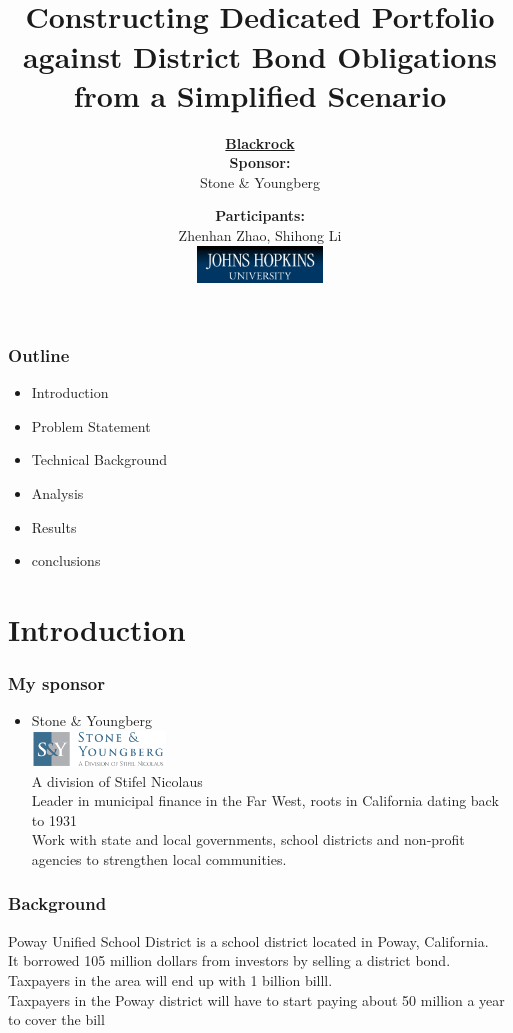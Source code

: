 \documentclass[compress,handout,10pt]{beamer}
\title{\\
{\color{black} \bf {\Large Constructing Dedicated Portfolio \\against District Bond Obligations \\from a Simplified Scenario}\newline \\
 } }
\subtitle{{\color{black} \bf{\underline{Blackrock} }\\ \vspace{2mm}\small \bf{Sponsor:}} \\\vspace{2mm}  \color{black} Stone \& Youngberg }
\author{  {\bf{Participants:}} \\ \vspace{2mm}
Zhenhan Zhao, Shihong Li\\
\vspace{2mm} 
\includegraphics[width=0.25\textwidth]{jhu.png} 
}
\institute{JHU AMS 2012 FALL}
\let\olditem\item
\renewcommand{\item}{\setlength{\itemsep}{0.5\baselineskip}\olditem}
\begin{document}
\begin{frame}[plain]
    \titlepage
\end{frame}

\begin{frame}
    \frametitle{Outline}
   \begin{itemize}
    \item Introduction 
    \item Problem Statement
        \item Technical Background 
\item Analysis
   \item Results
    \item conclusions
   \end{itemize}
\end{frame}

\section{Introduction}

\begin{frame}
    \frametitle{My sponsor}
\begin{itemize}
\item  Stone \& Youngberg\\
\includegraphics[width=0.28\textwidth]{stone.jpeg}\\
\vspace{4mm}
A division of Stifel Nicolaus\\ 
\vspace{3mm}
Leader in municipal finance in the Far West, roots in California dating back to 1931\\
\vspace{3mm}
Work with state and local governments, school districts and non-profit agencies to strengthen local communities.  

\end{itemize}
\end{frame}

\begin{frame}
    \frametitle{Background}
Poway Unified School District is a school district located in Poway, California.\\
\vspace{3mm}
It borrowed 105 million dollars from investors by selling a district bond.\\
Taxpayers in the area will end up with 1 billion billl. \\
\vspace{3mm}
Taxpayers in the Poway district will have to start paying about 50 million a year to cover the bill
\end{frame}
\end{document}
